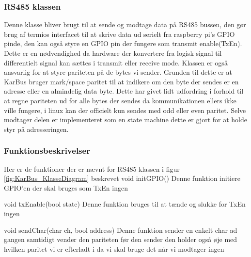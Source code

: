 {
}

\subsubsection{RS485 klassen}
Denne klasse bliver brugt til at sende og modtage data på RS485 bussen, den gør brug af termios interfacet til at skrive data ud serielt fra raspberry pi's GPIO pinde, den kan også styre en GPIO pin der fungere som transmit enable(TxEn). Dette er en nødvendighed da hardware der konvertere fra logisk signal til differentielt signal kan sættes i transmit eller receive mode. Klassen er også ansvarlig for at styre pariteten på de bytes vi sender. Grunden til dette er at KarBus bruger mark/space paritet til at indikere om den byte der sendes er en adresse eller en almindelig data byte. Dette har givet lidt udfordring i forhold til at regne pariteten ud for alle bytes der sendes da kommunikationen ellers ikke ville fungere, i linux kan der officielt kun sendes med odd eller even paritet.
Selve modtager delen er implementeret som en state machine dette er gjort for at holde styr på adresseringen.


\subsubsection{Funktionsbeskrivelser}
Her er de funktioner der er nævnt for RS485 klassen i figur \ref{fig:KarBus_KlasseDiagram} beskrevet
\funk
{void initGPIO()}
{Denne funktion initiere GPIO'en der skal bruges som TxEn}
{ingen}
{
}

\funk
{void txEnable(bool state)}
{Denne funktion bruges til at tænde og slukke for TxEn}
{ingen}
{
}

\funk
{void sendChar(char ch, bool address)}
{Denne funktion sender en enkelt char ad gangen samtidigt vender den pariteten før den sender den holder også øje med hvilken paritet vi er efterladt i da vi skal bruge det når vi modtager}
{ingen}
{
}

